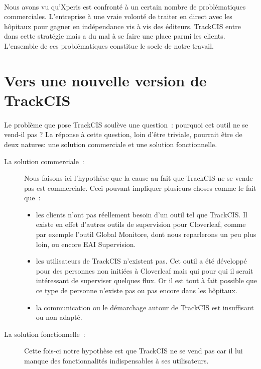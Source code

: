 	\paragraph{}
	Nous avons vu qu'Xperis est confronté à un certain nombre de problématiques
	commerciales. L'entreprise à une vraie volonté de traiter en direct avec les
	hôpitaux pour gagner en indépendance vis à vis des éditeurs. TrackCIS entre
	dans cette stratégie mais a du mal à se faire une place parmi les
	clients.\newline
	L'ensemble de ces problématiques constitue le socle de notre travail.
	
	\section{Vers une nouvelle version de TrackCIS}
		\paragraph{}%
		Le problème que pose TrackCIS soulève une question~: pourquoi cet outil ne se
		vend-il pas ? La réponse à cette question, loin d'être triviale, pourrait
		être de deux natures: une solution commerciale et une solution fonctionnelle.
		\begin{description}
			\item[La solution commerciale~: ] Nous faisons ici l'hypothèse que la cause
			au fait que TrackCIS ne se vende pas est commerciale. Ceci pouvant impliquer
			plusieurs choses comme le fait que~:
			\begin{itemize}
			  \item les clients n'ont pas réellement besoin d'un outil tel que TrackCIS.
			  Il existe en effet d'autres outils de supervision pour Cloverleaf, comme
			  par exemple l'outil Global Monitore, dont nous reparlerons un peu plus
			  loin, ou encore EAI Supervision.
			  \item les utilisateurs de TrackCIS n'existent pas. Cet outil a été
			  développé pour des personnes non initiées à Cloverleaf mais qui pour qui
			  il serait intéressant de superviser quelques flux.
			  Or il est tout à fait possible que ce type de personne n'existe pas ou pas
			  encore dans les hôpitaux.
			  \item la communication ou le démarchage autour de TrackCIS est insuffisant
			  ou non adapté.
			\end{itemize}
			\item[La solution fonctionnelle~: ] Cette fois-ci notre hypothèse est que
			TrackCIS ne se vend pas car il lui manque des fonctionnalités indispensables
			à ses utilisateurs.
		\end{description}
		
